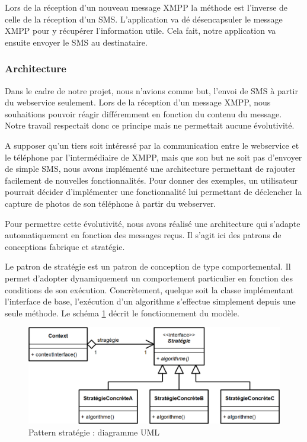 Lors de la réception d'un nouveau message XMPP la méthode est l'inverse de celle de la réception d'un SMS.
L'application va dé désencapsuler le message XMPP pour y récupérer l'information utile.
Cela fait, notre application va ensuite envoyer le SMS au destinataire.


\subsubsection{Architecture}

Dans le cadre de notre projet, nous n'avions comme but, l'envoi de SMS à partir du webservice seulement.
Lors de la réception d'un message XMPP, nous souhaitions pouvoir réagir différemment en fonction du contenu du message.
Notre travail respectait donc ce principe mais ne permettait aucune évolutivité.

A supposer qu'un tiers soit intéressé par la communication entre le webservice et le téléphone par 
l'intermédiaire de XMPP, mais que son but ne soit pas d'envoyer de simple SMS, nous avons implémenté une
architecture permettant de rajouter facilement de nouvelles fonctionnalités. Pour donner des exemples, 
un utilisateur pourrait décider d'implémenter une fonctionnalité lui permettant de déclencher la capture
de photos de son téléphone à partir du webserver.
 
Pour permettre cette évolutivité, nous avons réalisé une architecture qui s'adapte automatiquement en
fonction des messages reçus. Il s'agit ici des patrons de conceptions fabrique et stratégie. 



Le patron de stratégie est un patron de conception de type comportemental.
Il permet d'adopter dynamiquement un comportement particulier en fonction des conditions de son exécution.
Concrètement, quelque soit la classe implémentant l'interface de base, l'exécution d'un algorithme s'effectue simplement depuis une seule méthode.
Le schéma \ref{pattern_strategie} décrit le fonctionnement du modèle.

\begin{figure}[H]
  \center
  \includegraphics[width=12cm]{img/pattern_strategie.png}
  \caption{Pattern stratégie : diagramme UML}
  \label{pattern_strategie}
\end{figure}

